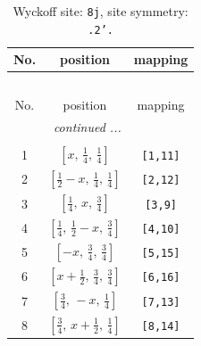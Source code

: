 \documentclass[fleqn,8pt]{jsarticle}
\begin{document}
\begin{longtable}{ccc}
\caption{Wyckoff site: {\tt 8j}, site symmetry: {\tt .2'.}}
 \\
 \hline \hline
No. & position & mapping \\ \hline \endfirsthead

\multicolumn{2}{l}{\tablename\ \thetable{}} \\
 \hline \hline
No. & position & mapping \\ \hline \endhead

 \hline \hline
\multicolumn{2}{r}{\footnotesize\it continued ...} \\ \endfoot

 \hline \hline
\multicolumn{2}{r}{} \\ \endlastfoot

1 & $\left[ x,\, \frac{1}{4},\, \frac{1}{4} \right]$ & {\tt [1,11]} \\ \hline
2 & $\left[ \frac{1}{2} - x,\, \frac{1}{4},\, \frac{1}{4} \right]$ & {\tt [2,12]} \\ \hline
3 & $\left[ \frac{1}{4},\, x,\, \frac{3}{4} \right]$ & {\tt [3,9]} \\ \hline
4 & $\left[ \frac{1}{4},\, \frac{1}{2} - x,\, \frac{3}{4} \right]$ & {\tt [4,10]} \\ \hline
5 & $\left[ - x,\, \frac{3}{4},\, \frac{3}{4} \right]$ & {\tt [5,15]} \\ \hline
6 & $\left[ x + \frac{1}{2},\, \frac{3}{4},\, \frac{3}{4} \right]$ & {\tt [6,16]} \\ \hline
7 & $\left[ \frac{3}{4},\, - x,\, \frac{1}{4} \right]$ & {\tt [7,13]} \\ \hline
8 & $\left[ \frac{3}{4},\, x + \frac{1}{2},\, \frac{1}{4} \right]$ & {\tt [8,14]} \\
\end{longtable}
\renewcommand{\arraystretch}{1.2}
\end{document}
